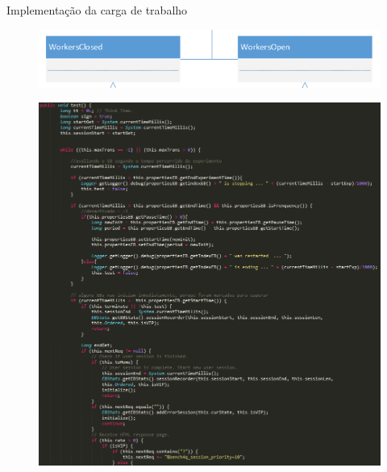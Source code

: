 \begin{frame}{Implementação da carga de trabalho}
	\begin{figure}[htb]
		\centering
		\includegraphics[scale=0.38]{images/diagram-code2.png}	
	\end{figure}
	\begin{figure}
		\centering
		\begin{minipage}{.45\textwidth}
			\centering
			\includegraphics[scale=0.2]{images/code2-1.png}	
		\end{minipage}
		\begin{minipage}{.45\textwidth}
			\centering

\end{minipage}
\end{figure}
\end{frame}
